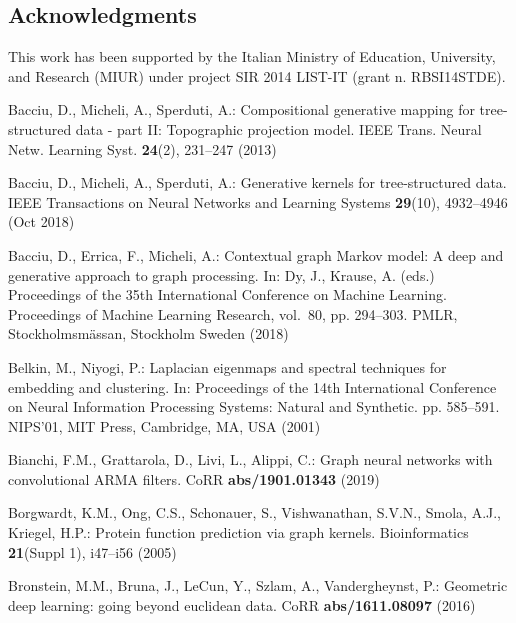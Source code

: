 \documentclass[runningheads]{llncs}
\begin{document}
\subsection*{Acknowledgments}
This work has been supported by the Italian Ministry of Education, University, and Research (MIUR) under project SIR 2014 LIST-IT (grant n. RBSI14STDE).


\begin{thebibliography}{10}
\providecommand{\url}[1]{\texttt{#1}}
\providecommand{\urlprefix}{URL }
\providecommand{\doi}[1]{https://doi.org/#1}

Bacciu, D., Micheli, A., Sperduti, A.: Compositional generative mapping for
  tree-structured data - part {II}: Topographic projection model. IEEE Trans.
  Neural Netw. Learning Syst.  \textbf{24}(2),  231--247 (2013)

{Bacciu}, D., {Micheli}, A., {Sperduti}, A.: Generative kernels for
  tree-structured data. IEEE Transactions on Neural Networks and Learning
  Systems  \textbf{29}(10),  4932--4946 (Oct 2018)

Bacciu, D., Errica, F., Micheli, A.: Contextual graph {M}arkov model: A deep
  and generative approach to graph processing. In: Dy, J., Krause, A. (eds.)
  Proceedings of the 35th International Conference on Machine Learning.
  Proceedings of Machine Learning Research, vol.~80, pp. 294--303. PMLR,
  Stockholmsmässan, Stockholm Sweden (2018)

Belkin, M., Niyogi, P.: Laplacian eigenmaps and spectral techniques for
  embedding and clustering. In: Proceedings of the 14th International
  Conference on Neural Information Processing Systems: Natural and Synthetic.
  pp. 585--591. NIPS'01, MIT Press, Cambridge, MA, USA (2001)

Bianchi, F.M., Grattarola, D., Livi, L., Alippi, C.: Graph neural networks with
  convolutional {ARMA} filters. CoRR  \textbf{abs/1901.01343} (2019)

Borgwardt, K.M., Ong, C.S., Schonauer, S., Vishwanathan, S.V.N., Smola, A.J.,
  Kriegel, H.P.: Protein function prediction via graph kernels. Bioinformatics
  \textbf{21}(Suppl 1),  i47--i56 (2005)

Bronstein, M.M., Bruna, J., LeCun, Y., Szlam, A., Vandergheynst, P.: Geometric
  deep learning: going beyond euclidean data. CoRR  \textbf{abs/1611.08097}
  (2016)


\end{thebibliography}
\end{document}
